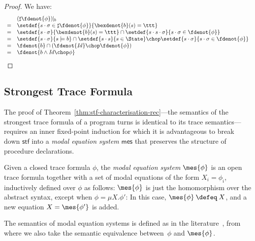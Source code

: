 \documentclass[a4paper,numberwithinsect]{lipics-v2021}
\begin{document}
\begin{proof}%
We have:
  \[
    \begin{array}{cl}
    & (\sharp\fdenot{\phi})\!\!\mid_b\\
    = & \setdef{s \cdot \sigma \in \sharp\fdenot{\phi}}{\bexdenot{b} (s) = \ttt} \\
    = & \setdef{s \cdot \sigma }{\bexdenot{b} (s) = \ttt} \cap\setdef{s \cdot s \cdot \sigma }{s\cdot\sigma\in\fdenot{\phi}}\\
    = & \setdef{s \cdot \sigma }{s\models b} \cap\setdef{s \cdot s}{s\in\State}\chop\setdef{s \cdot \sigma }{s\cdot\sigma\in\fdenot{\phi}}\\
    = & \fdenot{b} \cap(\fdenot{\mathit{Id}}\chop\fdenot{\phi})\\
    = & \fdenot{b\land\mathit{Id}\chop\phi}
    \end{array}
  \]%
\end{proof}

\subsection{Strongest Trace Formula}
\label{sec:stf-app}

The proof of Theorem~\ref{thm:stf-characterisation-rec}---the
semantics of the strongest trace formula of a program turns is
identical to its trace semantics---requires an inner fixed-point
induction for which it is advantageous to break down $\mathsf{stf}$
into a \emph{modal equation system} $\mathsf{mes}$ \cite{Mader97} that
preserves the structure of procedure declarations.

\begin{definition}
\label{def:meq}
  Given a closed trace formula $\phi$, the \emph{modal equation
  system} $\mes{\phi}$ is an open trace formula together with a set
  of modal equations of the form $X_i=\phi_i$, inductively defined
  over $\phi$ as follows: $\mes{\phi}$ is just the homomorphism over
  the abstract syntax, except when $\phi=\mu X.\phi'$: In this case,
  $\mes{\phi} \>\defeq\> X$, and a new equation $X=\mes{\phi'}$ is
  added.
\end{definition}

The semantics of modal equation systems is defined as in the
literature~\cite{Mader97}, from where we also take the semantic
equivalence between~$\phi$ and $\mes{\phi}$.
%
\end{document}
